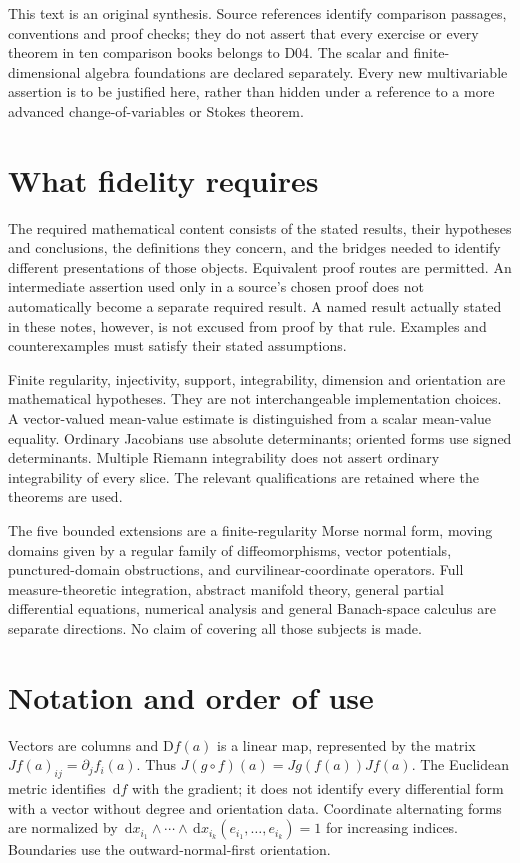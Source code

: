 \documentclass[11pt,oneside,openany]{book}
\theoremstyle{definition}
\theoremstyle{remark}
\newcounter{foundation}
\newcommand{\dd}{\,\mathrm d}
\newcommand{\D}{\mathrm D}
\begin{document}
This text is an original synthesis. Source references identify comparison
passages, conventions and proof checks; they do not assert that every exercise
or every theorem in ten comparison books belongs to D04. The scalar and
finite-dimensional algebra foundations are declared separately. Every new
multivariable assertion is to be justified here, rather than hidden under a
reference to a more advanced change-of-variables or Stokes theorem.

\section*{What fidelity requires}
The required mathematical content consists of the stated results, their
hypotheses and conclusions, the definitions they concern, and the bridges
needed to identify different presentations of those objects. Equivalent proof
routes are permitted. An intermediate assertion used only in a source's chosen
proof does not automatically become a separate required result. A named result
actually stated in these notes, however, is not excused from proof by that rule.
Examples and counterexamples must satisfy their stated assumptions.

Finite regularity, injectivity, support, integrability, dimension and orientation
are mathematical hypotheses. They are not interchangeable implementation
choices. A vector-valued mean-value estimate is distinguished from a scalar
mean-value equality. Ordinary Jacobians use absolute determinants; oriented
forms use signed determinants. Multiple Riemann integrability does not assert
ordinary integrability of every slice. The relevant qualifications are retained
where the theorems are used.

The five bounded extensions are a finite-regularity Morse normal form, moving
domains given by a regular family of diffeomorphisms, vector potentials,
punctured-domain obstructions, and curvilinear-coordinate operators. Full
measure-theoretic integration, abstract manifold theory, general partial
differential equations, numerical analysis and general Banach-space calculus
are separate directions. No claim of covering all those subjects is made.

\section*{Notation and order of use}
Vectors are columns and $\D f(a)$ is a linear map, represented by the matrix
$Jf(a)_{ij}=\partial_j f_i(a)$. Thus $J(g\circ f)(a)=Jg(f(a))Jf(a)$.
The Euclidean metric identifies $\dd f$ with the gradient; it does not identify
every differential form with a vector without degree and orientation data.
Coordinate alternating forms are normalized by
$\dd x_{i_1}\wedge\cdots\wedge\dd x_{i_k}(e_{i_1},\ldots,e_{i_k})=1$ for increasing
indices. Boundaries use the outward-normal-first orientation.
\end{document}
